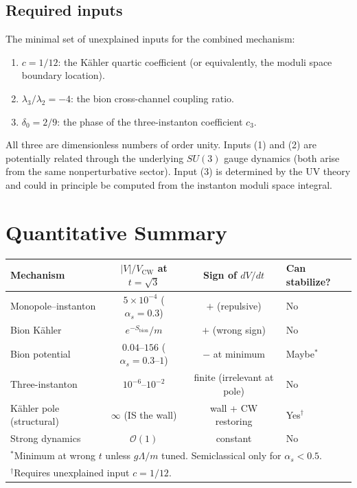 \subsection{Required inputs}

The minimal set of unexplained inputs for the combined mechanism:
\begin{enumerate}
\item $c = 1/12$: the K\"ahler quartic coefficient (or equivalently, the moduli space
boundary location).
\item $\lambda_3/\lambda_2 = -4$: the bion cross-channel coupling ratio.
\item $\delta_0 = 2/9$: the phase of the three-instanton coefficient $c_3$.
\end{enumerate}
All three are dimensionless numbers of order unity.
Inputs (1) and (2) are potentially related through the underlying $SU(3)$ gauge dynamics
(both arise from the same nonperturbative sector).
Input (3) is determined by the UV theory and could in principle be computed
from the instanton moduli space integral.


\section{Quantitative Summary}

\begin{center}
\begin{tabular}{lccl}
\textbf{Mechanism} & $|V|/V_{\text{CW}}$ at $t\!=\!\sqrt{3}$ & Sign of $dV/dt$ & \textbf{Can stabilize?} \\
\hline
Monopole--instanton & $5 \times 10^{-4}$ ($\alpha_s\!=\!0.3$) & $+$ (repulsive) & No \\
Bion K\"ahler & $e^{-S_{\text{bion}}}/m$ & $+$ (wrong sign) & No \\
Bion potential & $0.04$--$156$ ($\alpha_s\!=\!0.3$--$1$) & $-$ at minimum & Maybe$^*$ \\
Three-instanton & $10^{-6}$--$10^{-2}$ & finite (irrelevant at pole) & No \\
K\"ahler pole (structural) & $\infty$ (IS the wall) & wall + CW restoring & Yes$^\dagger$ \\
Strong dynamics & $\mathcal{O}(1)$ & constant & No \\[4pt]
\multicolumn{4}{l}{$^*$\small Minimum at wrong $t$ unless $g\Lambda/m$ tuned. Semiclassical only for $\alpha_s < 0.5$.} \\
\multicolumn{4}{l}{$^\dagger$\small Requires unexplained input $c = 1/12$.}
\end{tabular}
\end{center}


